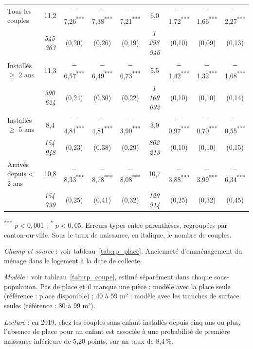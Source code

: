 \documentclass[11pt,a4paper]{article}
\theoremstyle{plain}
\theoremstyle{definition}
\theoremstyle{remark}
\newcommand{\sym}[1]{\textsuperscript{#1}}
\begin{document}
\begin{table}[htbp]
\begin{threeparttable}
\begin{tabular}{@{}lcccccccc@{}}
Tous les couples & 11,2 & $-$7,26\sym{***} & $-$7,38\sym{***} & $-$7,21\sym{***} & 6,0 & $-$1,72\sym{***} & $-$1,66\sym{***} & $-$2,27\sym{***} \\
  & \textit{545\,363} & (0,20) & (0,26) & (0,19) & \textit{1\,298\,946} & (0,10) & (0,09) & (0,13) \\
Installés $\geq$ 2 ans & 11,3 & $-$6,57\sym{***} & $-$6,49\sym{***} & $-$6,73\sym{***} & 5,5 & $-$1,42\sym{***} & $-$1,32\sym{***} & $-$1,68\sym{***} \\
  & \textit{390\,624} & (0,24) & (0,30) & (0,22) & \textit{1\,169\,032} & (0,10) & (0,10) & (0,14) \\
Installés $\geq$ 5 ans & 8,4 & $-$4,81\sym{***} & $-$4,81\sym{***} & $-$3,90\sym{***} & 3,9 & $-$0,97\sym{***} & $-$0,70\sym{***} & $-$0,55\sym{***} \\
  & \textit{154\,948} & (0,23) & (0,38) & (0,29) & \textit{802\,213} & (0,10) & (0,10) & (0,15) \\
Arrivés depuis < 2 ans & 10,8 & $-$8,33\sym{***} & $-$8,78\sym{***} & $-$8,08\sym{***} & 10,7 & $-$3,88\sym{***} & $-$3,99\sym{***} & $-$6,34\sym{***} \\
  & \textit{154\,739} & (0,25) & (0,41) & (0,32) & \textit{129\,914} & (0,25) & (0,32) & (0,45) \\
\bottomrule
\end{tabular}
\begin{tablenotes}\scriptsize
\item \sym{***} $p<0{,}001$ ; \sym{*} $p<0{,}05$. Erreurs-types entre parenthèses, regroupées par canton-ou-ville. Sous le taux de naissance, en italique, le nombre de couples.
\item \textit{Champ et source} : voir tableau~\ref{tab:rp_place}. Ancienneté d'emménagement du ménage dans le logement à la date de collecte.
\item \textit{Modèle} : voir tableau~\ref{tab:rp_coupe}, estimé séparément dans chaque sous-population. Pas de place et il manque une pièce : modèle avec la place seule (référence : place disponible) ; 40 à 59 m² : modèle avec les tranches de surface seules (référence : 80 à 99 m²).
\item \textit{Lecture} : en 2019, chez les couples sans enfant installés depuis cinq ans ou plus, l'absence de place pour un enfant est associée à une probabilité de première naissance inférieure de 5,20 points, sur un taux de 8,4\,\%.
\end{tablenotes}
\end{threeparttable}
\end{table}
\end{document}
